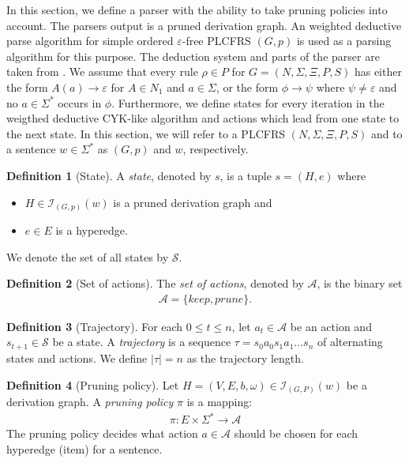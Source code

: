\documentclass{tudscrartcl}
\theoremstyle{definition}
\newtheorem{definition}{Definition}[section]
\begin{document}
In this section, we define a parser with the ability to take pruning policies into account. The parsers output is a pruned derivation graph.
An weighted deductive parse algorithm for simple ordered $\varepsilon$-free PLCFRS $(G, p)$ is used as a parsing algorithm for this purpose.
The deduction system and parts of the parser are taken from \cite{kallmeyer10}.
We assume that every rule $\rho \in P$ for $G = (N, \Sigma, \Xi, P, S)$ has either the form $A(a) \to \varepsilon$ for $A \in N_1$ and $a \in \Sigma$, or the form
$\phi \to \psi$ where $\psi \neq \varepsilon$ and no $a \in \Sigma^*$ occurs in $\phi$.
Furthermore, we define states for every iteration in the weigthed deductive CYK-like algorithm and actions which lead from one state to the next state.
In this section, we will refer to a PLCFRS $(N, \Sigma, \Xi, P, S)$ and to a sentence $w \in \Sigma^*$ as $(G, p)$ and $w$, respectively.

\begin{definition}[State]
	A \emph{state}, denoted by $s$, is a tuple $s = (H, e)$ where
	\begin{itemize}
		\item $H \in \mathcal{I}_{(G, p)}(w)$ is a pruned derivation graph and
		\item $e \in E$ is a hyperedge.
	\end{itemize}
	We denote the set of all states by $\mathcal{S}$.
\end{definition}

\begin{definition}[Set of actions]
	The \emph{set of actions}, denoted by $\mathcal{A}$,
	is the binary set
	\begin{align*}
		\mathcal{A} = \{keep, prune\}.
	\end{align*}
\end{definition}

\begin{definition}[Trajectory]
	For each $0 \leq t \leq n$, let $a_t \in \mathcal{A}$ be an action
	and $s_{t+1} \in \mathcal{S}$ be a state.
	A \emph{trajectory} is a sequence $\tau = s_0a_0s_1a_1 \ldots s_n$ of alternating
	states and actions.
	We define $|\tau | = n$ as the trajectory length.
\end{definition}

\begin{definition}[Pruning policy]
	Let $H = (V, E, b, \omega) \in \mathcal{I}_{(G, P)}(w)$ be a derivation graph.
	A \emph{pruning policy} $\pi$ is a mapping:
	\begin{align*}
		\pi : E \times \Sigma^* \to \mathcal{A}
	\end{align*}
	The pruning policy decides what action $a \in \mathcal{A}$ should be chosen for each
	hyperedge (item) for a sentence.
\end{definition}
\end{document}
